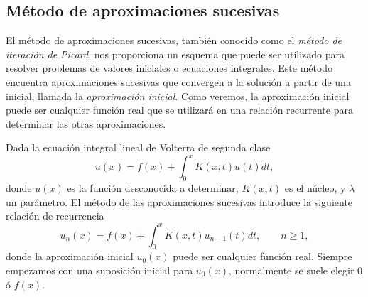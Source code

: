 \subsection{Método de aproximaciones sucesivas}
El método de aproximaciones sucesivas, también conocido como el \textit{método de iteración de Picard}, nos proporciona un esquema que puede ser utilizado para resolver problemas de valores iniciales o ecuaciones integrales. Este método encuentra aproximaciones sucesivas que convergen a la solución a partir de una inicial, llamada la \textit{aproximación inicial}. Como veremos, la aproximación inicial puede ser cualquier función real que se utilizará en una relación recurrente para determinar las otras aproximaciones.

Dada la ecuación integral lineal de Volterra de segunda clase
\begin{equation}
	u(x) = f(x) +\int_{0}^{x} K(x,t)u(t)dt,
\end{equation}
donde $u(x)$ es la función desconocida a determinar, $K(x,t)$ es el núcleo, y $\lambda$ un parámetro. El método de las aproximaciones sucesivas introduce la siguiente relación de recurrencia
\begin{equation}\label{eq:wowo}
	u_n(x) = f(x) + \int_{0}^{x} K(x,t)u_{n-1}(t)dt, \qquad n \geqslant 1,
\end{equation}
donde la aproximación inicial $u_0(x)$ puede ser cualquier función real. Siempre empezamos con una suposición inicial para $u_0(x)$, normalmente se suele elegir $0$ ó $f(x)$.

